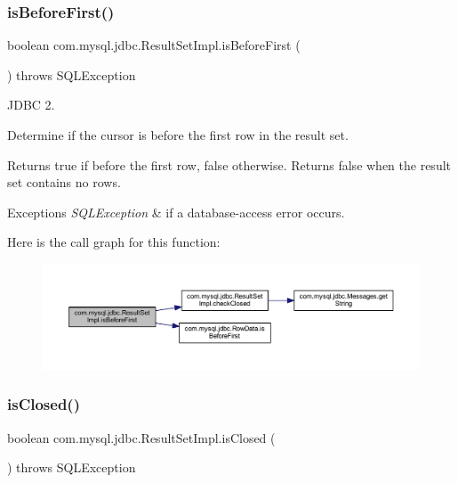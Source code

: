 \subsubsection{\texorpdfstring{is\+Before\+First()}{isBeforeFirst()}}
{\footnotesize\ttfamily boolean com.\+mysql.\+jdbc.\+Result\+Set\+Impl.\+is\+Before\+First (\begin{DoxyParamCaption}{ }\end{DoxyParamCaption}) throws S\+Q\+L\+Exception}

J\+D\+BC 2.

Determine if the cursor is before the first row in the result set. 

\begin{DoxyReturn}{Returns}
true if before the first row, false otherwise. Returns false when the result set contains no rows.
\end{DoxyReturn}

\begin{DoxyExceptions}{Exceptions}
{\em S\+Q\+L\+Exception} & if a database-\/access error occurs. \\
\hline
\end{DoxyExceptions}
Here is the call graph for this function\+:
\nopagebreak
\begin{figure}[H]
\begin{center}
\leavevmode
\includegraphics[width=350pt]{classcom_1_1mysql_1_1jdbc_1_1_result_set_impl_a4bcb82a7e4b69b3662d741862ccca1e6_cgraph}
\end{center}
\end{figure}
\mbox{\label{classcom_1_1mysql_1_1jdbc_1_1_result_set_impl_a39bb407e38c65cf1779e8fd341ac08b5}} 
\subsubsection{\texorpdfstring{is\+Closed()}{isClosed()}}
{\footnotesize\ttfamily boolean com.\+mysql.\+jdbc.\+Result\+Set\+Impl.\+is\+Closed (\begin{DoxyParamCaption}{ }\end{DoxyParamCaption}) throws S\+Q\+L\+Exception}

